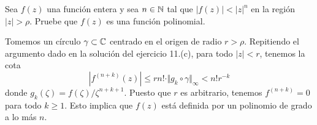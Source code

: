 \begin{exercise}
Sea $f(z)$ una función entera y sea $n \in \mathbb N$ tal que $|f(z)| < |z|^n$ en la región $|z| > \rho$. Pruebe que $f(z)$ es una función polinomial.
\end{exercise}

\begin{solution}
Tomemos un círculo $\gamma \subset \mathbb C$ centrado en el origen de radio $r > \rho$. Repitiendo el argumento dado en la solución del ejercicio 11.(c), para todo $|z| < r$, tenemos la cota
$$|f^{(n+k)}(z)| \le rn! \cdot \Vert g_k \circ \gamma \Vert_\infty < n! r^{-k}$$
donde $g_k(\zeta) = f(\zeta) / \zeta^{n+k+1}$. Puesto que $r$ es arbitrario, tenemos $f^{(n+k)} = 0$ para todo $k \ge 1$. Esto implica que $f(z)$ está definida por un polinomio de grado a lo más $n$.
\end{solution}
